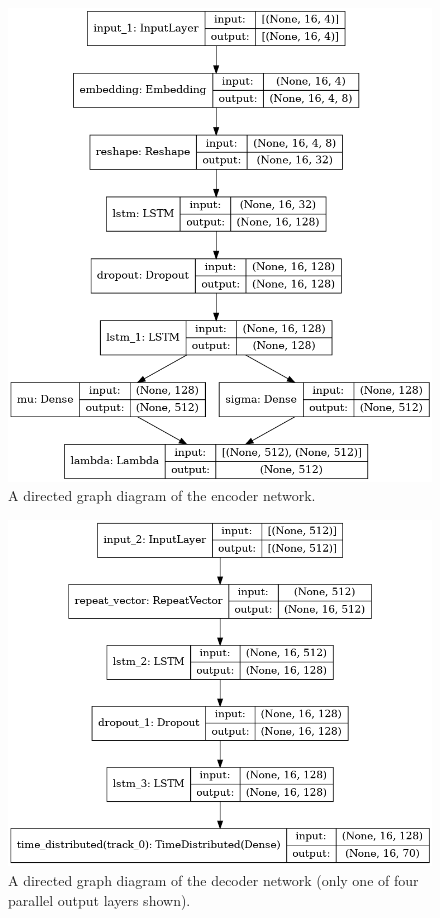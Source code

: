 \documentclass[sigconf,authorversion]{acmart}
\begin{document}
\begin{figure}[h]
  \centering
  \includegraphics[width=\linewidth]{figures/encoder.png}
  \caption{A directed graph diagram of the encoder network.}
  \label{encoder}
\end{figure}


\begin{figure}[h]
  \centering
  \includegraphics[width=\linewidth]{figures/decoder.png}
  \caption{A directed graph diagram of the decoder network (only one
    of four parallel output layers shown).}
  \label{decoder}
\end{figure}
\end{document}
